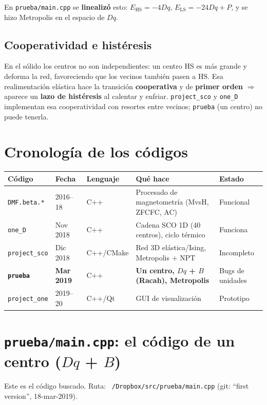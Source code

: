 \documentclass[11pt,a4paper]{article}
\newcommand{\HS}{\mathrm{HS}}
\newcommand{\LS}{\mathrm{LS}}
\newcommand{\Dq}{Dq}
\begin{document}
En \texttt{prueba/main.cpp} se \textbf{linealizó} esto: $E_{\HS}=-4\Dq$,
$E_{\LS}=-24\Dq+P$, y se hizo Metropolis en el espacio de $\Dq$.

\subsection{Cooperatividad e histéresis}

En el sólido los centros no son independientes: un centro $\HS$ es más grande y
deforma la red, favoreciendo que los vecinos también pasen a $\HS$. Esa
realimentación elástica hace la transición \textbf{cooperativa} y de
\textbf{primer orden} $\Rightarrow$ aparece un \textbf{lazo de histéresis} al
calentar y enfriar. \texttt{project\_sco} y \texttt{one\_D} implementan esa
cooperatividad con resortes entre vecinos; \texttt{prueba} (un centro) no puede
tenerla.

\section{Cronología de los códigos}

\begin{center}
\begin{tabular}{lllll}
\toprule
Código & Fecha & Lenguaje & Qué hace & Estado \\
\midrule
\texttt{DMF.beta.*} & 2016--18 & C++ & Procesado de magnetometría (MvsH, ZFCFC, AC) & Funcional \\
\texttt{one\_D} & Nov 2018 & C++ & Cadena SCO 1D (40 centros), ciclo térmico & Funciona \\
\texttt{project\_sco} & Dic 2018 & C++/CMake & Red 3D elástica/Ising, Metropolis + NPT & Incompleto \\
\textbf{\texttt{prueba}} & \textbf{Mar 2019} & C++ & \textbf{Un centro, $\Dq$ + $B$ (Racah), Metropolis} & Bugs de unidades \\
\texttt{project\_one} & 2019--20 & C++/Qt & GUI de visualización & Prototipo \\
\bottomrule
\end{tabular}
\end{center}

\section{\texttt{prueba/main.cpp}: el código de un centro ($\Dq$ + $B$)}

Este es el código buscado. Ruta: \texttt{~/Dropbox/src/prueba/main.cpp}
(git: ``first version'', 18-mar-2019).
\end{document}
